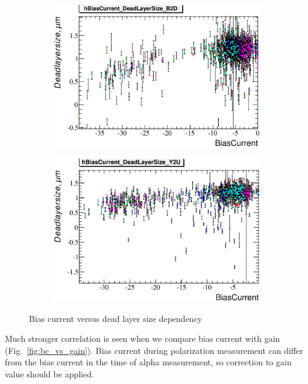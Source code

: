 \documentclass[a4paper]{article}
\begin{document}
\begin{figure}[p]
\begin{subfigure}[b]{0.5\textwidth}
\includegraphics[width=\textwidth]{gfx/run13_alpha_study/B2D/c_hBiasCurrent_DeadLayerSize.eps}
\end{subfigure}
\begin{subfigure}[b]{0.5\textwidth}
\includegraphics[width=\textwidth]{gfx/run13_alpha_study/Y2U/c_hBiasCurrent_DeadLayerSize.eps}
\end{subfigure}
\caption{Bias current versus dead layer size dependency}
\label{fig:bc_vs_xdl}
\end{figure}

Much stronger correlation is seen when we compare bias current with gain (Fig.~\ref{fig:bc_vs_gain}).
Bias current during polarization measurement can differ from the bias current in the time of
alpha measurement, so correction to gain value should be applied.
\end{document}
